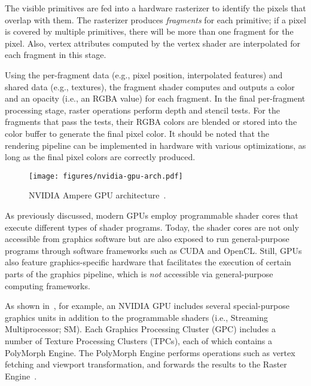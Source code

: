 The visible primitives are fed into a hardware rasterizer to identify the
pixels that overlap with them. The rasterizer produces \emph{fragments} for
each primitive; if a pixel is covered by multiple primitives, there will be
more than one fragment for the pixel.
%
Also, vertex attributes computed by the vertex shader are interpolated for each
fragment in this stage. 

Using the per-fragment data (e.g., pixel position, interpolated features) and
shared data (e.g., textures), the fragment shader computes and outputs a color
and an opacity (i.e., an RGBA value) for each fragment. 
%
In the final per-fragment processing stage, raster operations perform depth and
stencil tests. For the fragments that pass the tests, their RGBA colors are
blended or stored into the color buffer to generate the final pixel color.
%
It should be noted that the rendering pipeline can be implemented in
hardware with various optimizations, as long as the final pixel colors are
correctly produced.

\begin{figure}[t]
  \centering
  \texttt{[image: figures/nvidia-gpu-arch.pdf]}
  \caption{NVIDIA Ampere GPU architecture~\cite{ampere}.}
  \vspace{-0.20in}
  \label{fig:nvidia-gpu-arch}
\end{figure}

%
As previously discussed, modern GPUs employ programmable shader cores that
execute different types of shader programs. Today, the shader cores are not
only accessible from graphics software but are also exposed to run
general-purpose programs through software frameworks such as CUDA and OpenCL.
%
Still, GPUs also feature graphics-specific hardware that facilitates the
execution of certain parts of the graphics pipeline, which is \emph{not}
accessible via general-purpose computing frameworks.

As shown in~, for example, an NVIDIA GPU includes
several special-purpose graphics units in addition to the programmable shaders
(i.e., Streaming Multiprocessor; SM).
%
Each Graphics Processing Cluster (GPC) includes a number of Texture Processing
Clusters (TPCs), each of which contains a PolyMorph Engine. The PolyMorph
Engine performs operations such as vertex fetching and viewport transformation,
and forwards the results to the Raster Engine~\cite{wit:kil11}.

